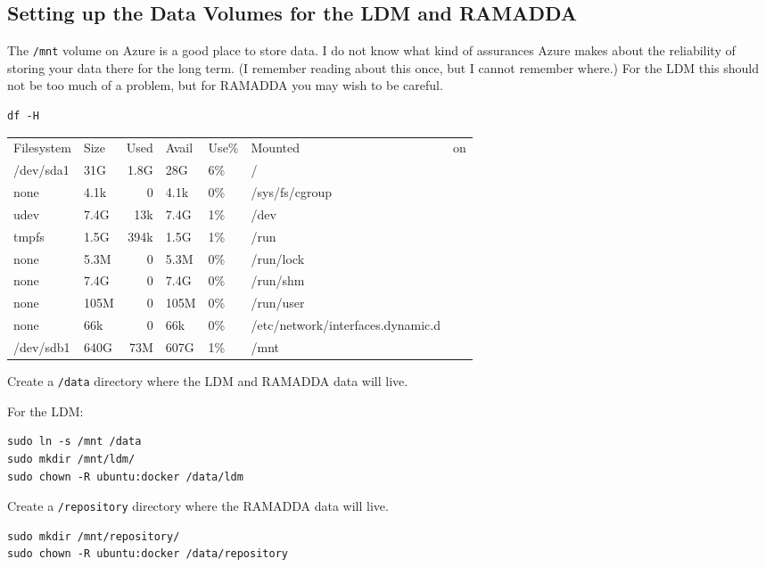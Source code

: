 \documentclass[11pt]{article}
\begin{document}
\subsection*{Setting up the Data Volumes for the LDM and RAMADDA}
\label{sec:orgheadline11}

The \texttt{/mnt} volume on Azure is a good place to store data. I do not know what kind of assurances Azure makes about the reliability of storing your data there for the long term. (I remember reading about this once, but I cannot remember where.) For the LDM this should not be too much of a problem, but for RAMADDA you may wish to be careful.

\begin{verbatim}
df -H
\end{verbatim}

\begin{center}
\begin{tabular}{llrllll}
Filesystem & Size & Used & Avail & Use\% & Mounted & on\\
/dev/sda1 & 31G & 1.8G & 28G & 6\% & / & \\
none & 4.1k & 0 & 4.1k & 0\% & /sys/fs/cgroup & \\
udev & 7.4G & 13k & 7.4G & 1\% & /dev & \\
tmpfs & 1.5G & 394k & 1.5G & 1\% & /run & \\
none & 5.3M & 0 & 5.3M & 0\% & /run/lock & \\
none & 7.4G & 0 & 7.4G & 0\% & /run/shm & \\
none & 105M & 0 & 105M & 0\% & /run/user & \\
none & 66k & 0 & 66k & 0\% & /etc/network/interfaces.dynamic.d & \\
/dev/sdb1 & 640G & 73M & 607G & 1\% & /mnt & \\
\end{tabular}
\end{center}

Create a \texttt{/data} directory where the LDM and RAMADDA data will live. 

For the LDM:

\begin{verbatim}
sudo ln -s /mnt /data
sudo mkdir /mnt/ldm/
sudo chown -R ubuntu:docker /data/ldm
\end{verbatim}

Create a \texttt{/repository} directory where the RAMADDA data will live.

\begin{verbatim}
sudo mkdir /mnt/repository/
sudo chown -R ubuntu:docker /data/repository
\end{verbatim}
\end{document}
